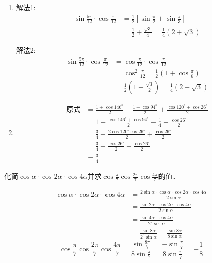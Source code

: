 \begin{solution}
\begin{enumerate}
    \item 解法1: 
\[\begin{split}
    \sin\frac{5\pi}{12}\cdot\cos\frac{\pi}{12}&=\frac{1}{2}\left[\sin\frac{\pi}{2}+\sin\frac{\pi}{3}\right]\\
    &=\frac{1}{2}+\frac{\sqrt{3}}{4}=\frac{1}{4}(2+\sqrt{3})
\end{split}\]    

解法2: 
\[\begin{split}
    \sin\frac{5\pi}{12}\cdot\cos\frac{\pi}{12}&=\cos\frac{\pi}{12}\cdot \cos\frac{\pi}{12}\\
    &=\cos^2\frac{\pi}{12}=\frac{1}{2}\left(1+\cos\frac{\pi}{6}\right)\\
    &=\frac{1}{2}\left(1+\frac{\sqrt{3}}{2}\right)=\frac{1}{4}\left(2+\sqrt{3}\right)
\end{split}\]    

\item \[\begin{split}
    \text{原式}&=\frac{1+\cos146^{\circ}}{2}+\frac{1+\cos94^{\circ}}{2}+\frac{\cos120^{\circ}+\cos26^{\circ}}{2}\\
    &=1+\frac{\cos146^{\circ}+\cos94^{\circ}}{2}-\frac{1}{4}+\frac{\cos26^{\circ}}{2}\\
    &=\frac{3}{4}+\frac{2\cos120^{\circ}\cos26^{\circ}}{2}+\frac{\cos26^{\circ}}{2}\\
    &=\frac{3}{4}-\frac{\cos26^{\circ}}{2}+\frac{\cos26^{\circ}}{2}\\
    &=\frac{3}{4}
\end{split}\]
\end{enumerate}
\end{solution}


\begin{example}
化简$\cos\alpha\cdot \cos2\alpha\cdot \cos4\alpha$并求$\cos\frac{\pi}{7}\cos\frac{2\pi}{7}\cos\frac{4\pi}{7}$的值．
\end{example}

\begin{solution}
\[\begin{split}
    \cos\alpha\cdot \cos2\alpha\cdot \cos4\alpha&=\frac{2\sin\alpha\cdot \cos\alpha\cdot \cos2\alpha\cdot \cos4\alpha}{2\sin\alpha}\\
    &=\frac{\sin2\alpha\cdot \cos2\alpha\cdot \cos4\alpha}{2\sin\alpha}\\
    &=\frac{\sin4\alpha\cdot \cos4\alpha}{2^2\sin\alpha}\\
    &=\frac{\sin8\alpha}{2^3\sin\alpha}=\frac{\sin 8\alpha}{8\sin \alpha}
\end{split}
\]
\[\cos\frac{\pi}{7}\cos\frac{2\pi}{7}\cos\frac{4\pi}{7}=\frac{\sin \frac{8\pi}{7}}{8\sin \frac{\pi}{7}}=\frac{-\sin\frac{\pi}{7}}{8\sin\frac{\pi}{7}}=-\frac{1}{8}\]
    
\end{solution}

